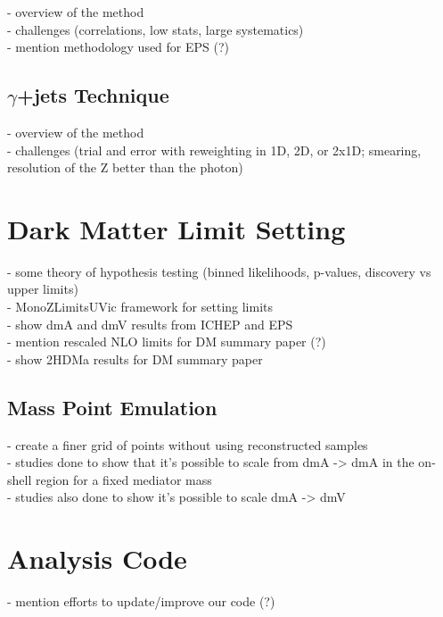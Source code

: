 - overview of the method\\
- challenges (correlations, low stats, large systematics)\\
- mention methodology used for EPS (?)\\

\subsection{$\gamma$+jets Technique}

- overview of the method\\
- challenges (trial and error with reweighting in 1D, 2D, or 2x1D; smearing, resolution of the Z better than the photon)\\

\section{Dark Matter Limit Setting}

- some theory of hypothesis testing (binned likelihoods, p-values, discovery vs upper limits)\\
- MonoZLimitsUVic framework for setting limits\\
- show dmA and dmV results from ICHEP and EPS\\
- mention rescaled NLO limits for DM summary paper (?)\\
- show 2HDMa results for DM summary paper\\

\subsection{Mass Point Emulation}

- create a finer grid of points without using reconstructed samples\\
- studies done to show that it's possible to scale from dmA -> dmA in the on-shell region for a fixed mediator mass\\
- studies also done to show it's possible to scale dmA -> dmV\\

\section{Analysis Code}
- mention efforts to update/improve our code (?)